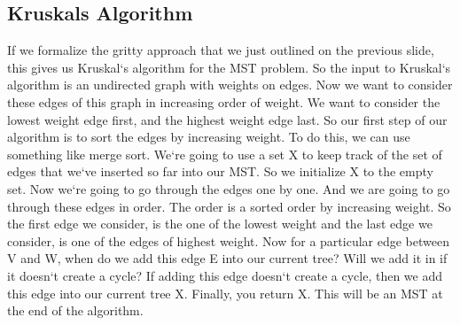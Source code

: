\subsection{Kruskals Algorithm}
If we formalize the gritty approach that we just outlined on the previous slide, this gives us Kruskal`s algorithm for the MST problem.
So the input to Kruskal`s algorithm is an undirected graph with weights on edges.
Now we want to consider these edges of this graph in increasing order of weight.
We want to consider the lowest weight edge first, and the highest weight edge last.
So our first step of our algorithm is to sort the edges by increasing weight.
To do this, we can use something like merge sort.
We`re going to use a set X to keep track of the set of edges that we`ve inserted so far into our MST\@.
So we initialize X to the empty set.
Now we`re going to go through the edges one by one.
And we are going to go through these edges in order.
The order is a sorted order by increasing weight.
So the first edge we consider, is the one of the lowest weight and the last edge we consider, is one of the edges of highest weight.
Now for a particular edge between V and W, when do we add this edge E into our current tree? Will we add it in if it doesn`t create a cycle? If adding this edge doesn`t create a cycle, then we add this edge into our current tree X\@.
Finally, you return X\@.
This will be an MST at the end of the algorithm.

